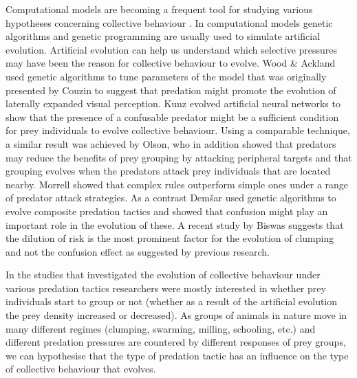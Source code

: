 Computational models are becoming a frequent tool for studying various hypotheses concerning collective behaviour \cite{lebarbajec2009organized,sumpter2006principles,vicsek2012collective}. In computational models genetic algorithms \cite{holland1992adaptation} and genetic programming \cite{koza1992genetic} are usually used to simulate artificial evolution. Artificial evolution can help us understand which selective pressures may have been the reason for collective behaviour to evolve. Wood \& Ackland \cite{wood2007evolving} used genetic algorithms to tune parameters of the model that was originally presented by Couzin\etal \cite{couzin2002collective} to suggest that predation might promote the evolution of laterally expanded visual perception. Kunz\etal \cite{kunz2006prey} evolved artificial neural networks to show that the presence of a confusable predator might be a sufficient condition for prey individuals to evolve collective behaviour. Using a comparable technique, a similar result was achieved by Olson\etal \cite{olson2013predator,olson2016evolution}, who in addition showed that predators may reduce the benefits of prey grouping by attacking peripheral targets and that grouping evolves when the predators attack prey individuals that are located nearby. Morrell\etal \cite{morrell2015consequences} showed that complex rules outperform simple ones under a range of predator attack strategies. As a contrast Demšar\etal \cite{demsar2015simulating} used genetic algorithms to evolve composite predation tactics and showed that confusion might play an important role in the evolution of these. A recent study by Biswas\etal \cite{biswas2014causes} suggests that the dilution of risk is the most prominent factor for the evolution of clumping and not the confusion effect as suggested by previous research.

In the studies that investigated the evolution of collective behaviour under various predation tactics \cite{biswas2014causes,morrell2015consequences,olson2013predator,olson2016evolution} researchers were mostly interested in whether prey individuals start to group or not (\ie whether as a result of the artificial evolution the prey density increased or decreased). As groups of animals in nature move in many different regimes (clumping, swarming, milling, schooling, etc.) \cite{krause2002living,suzuki1973movement} and different predation pressures are countered by different responses of prey groups, we can hypothesise that the type of predation tactic has an influence on the type of collective behaviour that evolves.

